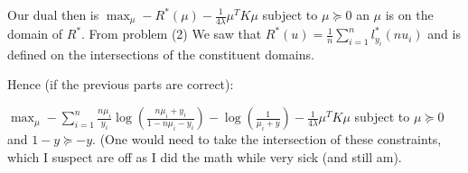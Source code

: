 \documentclass[12pt]{article}
\begin{document}
Our dual then is $\max_\mu -R^*(\mu) - \frac{1}{4\lambda} \mu^T K \mu$ subject to $\mu \succeq 0$ an $\mu$ is on the domain of $R^*$. From problem (2) We saw that $R^*(u) = \frac{1}{n} \sum_{i=1}^n l^*_{y_i}(nu_i)$ and is defined on the intersections of the constituent domains.

Hence (if the previous parts are correct):

$\max_{\mu} -\sum_{i=1}^n \frac{n\mu_i}{y_i} \log(\frac{n\mu_i+y_i}{1-n\mu_i-y_i}) - \log (\frac{1}{\mu_i+y}) - \frac{1}{4\lambda} \mu^T K \mu$ subject to $\mu \succeq 0$ and $ 1-y \succeq -y$. (One would need to take the intersection of these constraints, which I suspect are off as I did the math while very sick (and still am).
\end{document}

